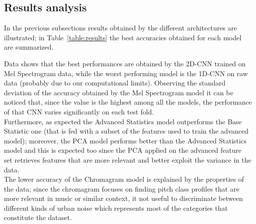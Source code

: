 \documentclass[oneside,openany]{article}
\begin{document}
    \subsection{Results analysis}
    \label{subsection:results}
    In the previous subsections results obtained by the different architectures are illustrated; in Table~\ref{table:results} the best accuracies obtained for each model are summarized.\\
        \begin{table}[!ht]
    \caption{Best results obtained by the different models}
    \label{table:results}
    \end{table}
    Data shows that the best performances are obtained by the 2D-CNN trained on Mel Spectrogram data, while the worst performing model is the 1D-CNN on raw data (probably due to our computational limits). Observing the standard deviation of the accuracy obtained by the Mel Spectrogram model it can be noticed that, since the value is the highest among all the models, the performance of that CNN varies significantly on each test fold. \\
    Furthermore, as expected the Advanced Statistics model outperforms the Base Statistic one (that is fed with a subset of the features used to train the advanced model); moreover, the PCA model performs better than the Advanced Statistics model and this is expected too since the PCA applied on the advanced feature set retrieves features that are more relevant and better exploit the variance in the data. \\
    The lower accuracy of the Chromagram model is explained by the properties of the data; since the chromagram focuses on finding pitch class profiles that are more relevant in music or similar context, it not useful to discriminate between different kinds of urban noise which represents most of the categories that constitute the dataset.  
\end{document}
